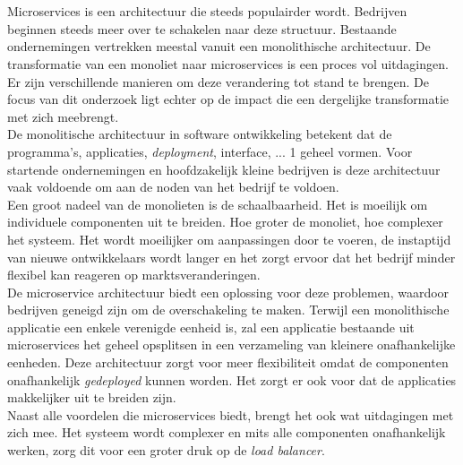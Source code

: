 
\chapter{}
\label{ch:inleiding}

Microservices is een architectuur die steeds populairder wordt. Bedrijven beginnen steeds meer over te schakelen naar deze structuur. Bestaande ondernemingen vertrekken meestal vanuit een monolithische architectuur. De transformatie van een monoliet naar microservices is een proces vol uitdagingen. Er zijn verschillende manieren om deze verandering tot stand te brengen. De focus van dit onderzoek ligt echter op de impact die een dergelijke transformatie met zich meebrengt.\\

De monolitische architectuur in software ontwikkeling betekent dat de programma's, applicaties, \emph{deployment}, interface, ... 1 geheel vormen. Voor startende ondernemingen en hoofdzakelijk kleine bedrijven is deze architectuur vaak voldoende om aan de noden van het bedrijf te voldoen.\\

Een groot nadeel van de monolieten is de schaalbaarheid. Het is moeilijk om individuele componenten uit te breiden. Hoe groter de monoliet, hoe complexer het systeem. Het wordt moeilijker om aanpassingen door te voeren, de instaptijd van nieuwe ontwikkelaars wordt langer en het zorgt ervoor dat het bedrijf minder flexibel kan reageren op marktsveranderingen.\\

De microservice architectuur biedt een oplossing voor deze problemen, waardoor bedrijven geneigd zijn om de overschakeling te maken. Terwijl een monolithische applicatie een enkele verenigde eenheid is, zal een applicatie bestaande uit microservices het geheel opsplitsen in een verzameling van kleinere onafhankelijke eenheden. Deze architectuur zorgt voor meer flexibiliteit omdat de componenten onafhankelijk \emph{gedeployed} kunnen worden. Het zorgt er ook voor dat de applicaties makkelijker uit te breiden zijn. \\

Naast alle voordelen die microservices biedt, brengt het ook wat uitdagingen met zich mee. Het systeem wordt complexer en mits alle componenten onafhankelijk werken, zorg dit voor een groter druk op de \emph{load balancer}.

